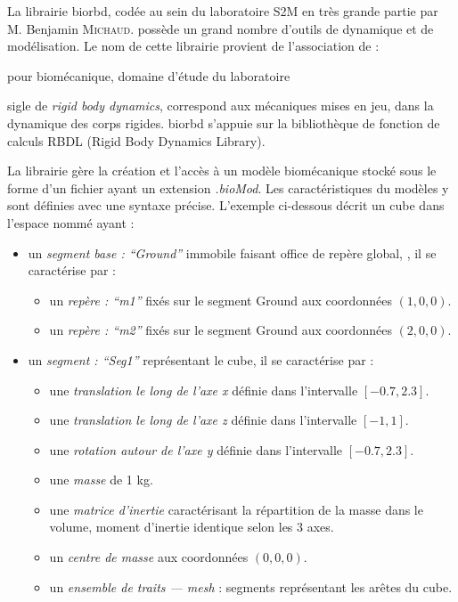         
La librairie \gls{biorbd}, codée au sein du laboratoire S2M en très grande partie par M. Benjamin \textsc{Michaud}. possède un grand nombre d’outils de dynamique et de modélisation. Le nom de cette librairie provient de l'association de :

\begin{description}
\setlength\itemsep{-0.5em}
\item[bio :] pour biomécanique, domaine d’étude du laboratoire
\item[rbd :] sigle de \emph{rigid body dynamics}, correspond aux mécaniques mises en jeu, dans la dynamique des corps rigides. \gls{biorbd} s’appuie sur la bibliothèque de fonction de calculs RBDL (Rigid Body Dynamics Library).
\end{description}

La librairie gère la création et l'accès à un modèle biomécanique stocké sous le forme d'un fichier ayant un extension \emph{.bioMod}. Les caractéristiques du modèles y sont définies avec une syntaxe précise. L'exemple ci-dessous décrit un cube dans l'espace nommé ayant :

\begin{itemize}
\item un \emph{segment base : ``Ground''} immobile faisant office de repère global, , il se caractérise par :
    \begin{itemize}
    \vspace{-0.5em}
    \setlength\itemsep{-0.2em}
    \item un \emph{repère : ``m1''} fixés sur le segment Ground aux coordonnées $(1, 0, 0)$.
    \item un \emph{repère : ``m2''} fixés sur le segment Ground aux coordonnées $(2, 0, 0)$.
    \end{itemize}
\item un \emph{segment : ``Seg1''} représentant le cube, il se caractérise par :
    \begin{itemize}
    \vspace{-0.5em}
    \setlength\itemsep{-0.2em}
    \item une \emph{translation le long de l'axe x} définie dans l'intervalle $[-0.7, 2.3]$.
    \item une \emph{translation le long de l'axe z} définie dans l'intervalle $[-1, 1]$.
    \item une \emph{rotation autour de l'axe y} définie dans l'intervalle $[-0.7, 2.3]$.
    \item une \emph{masse} de 1 kg.
    \item une \emph{matrice d'inertie} caractérisant la répartition de la masse dans le volume, moment d’inertie identique selon les 3 axes.
    \item un \emph{centre de masse} aux coordonnées $(0, 0, 0)$.
    \item un \emph{ensemble de traits --- \emph{mesh}} : segments représentant les arêtes du cube.
    \end{itemize}
\end{itemize}

